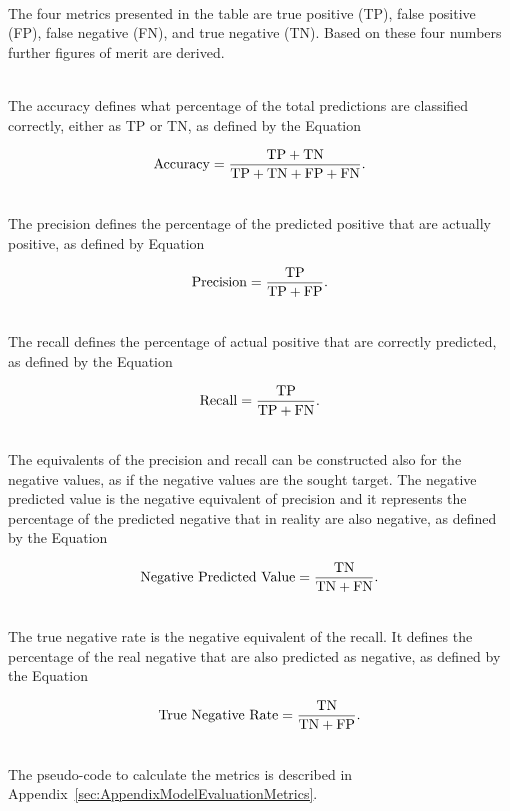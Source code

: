\ \\The four metrics presented in the table are true positive (TP), false positive (FP), false negative (FN), and true negative (TN). Based on these four numbers further figures of merit are derived.

\ \\The accuracy defines what percentage of the total predictions are classified correctly, either as TP or TN, as defined by the Equation

\begin{equation}
   \Accuracy = \frac{\TP + \TN}{\TP + \TN + \FP + \FN}.
\end{equation}

\ \\The precision defines the percentage of the predicted positive that are actually positive, as defined by Equation

\begin{equation}
   \Precision = \frac{\TP}{\TP + \FP}.
\end{equation}

\ \\The recall defines the percentage of actual positive that are correctly predicted, as defined by the Equation

\begin{equation}
   \Recall = \frac{\TP}{\TP + \FN}.
\end{equation}

\ \\ The equivalents of the precision and recall can be constructed also for the negative values, as if the negative values are the sought target. The negative predicted value is the negative equivalent of precision and it represents the percentage of the predicted negative that in reality are also negative, as defined by the Equation

\begin{equation}
   \NegativePredictedValue = \frac{\TN}{\TN + \FN}.
\end{equation}

\ \\The true negative rate is the negative equivalent of the recall. It defines the percentage of the real negative that are also predicted as negative, as defined by the Equation 

\begin{equation}
   \TrueNegativeRate = \frac{\TN}{\TN + \FP}.
\end{equation} 

\ \\The pseudo-code to calculate the metrics is described in Appendix~\ref{sec:AppendixModelEvaluationMetrics}. 

